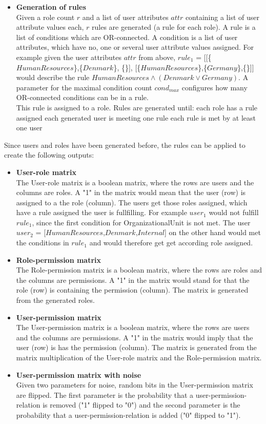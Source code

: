 \begin{itemize}
		\item \textbf{Generation of rules}\\
		Given a role count $r$ and a list of user attributes $attr$ containing a list of user attribute values each, $r$ rules are generated (a rule for each role). A rule is a list of conditions which are OR-connected. A condition is a list of user attributes, which have no, one or several user attribute values assigned. For example given the user attributes $attr$ from above, $rule_1$ = [[\{$HumanResources$\},\{$Denmark$\}, \{\}], [\{$HumanResources$\},\{$Germany$\},\{\}]] would describe the rule $HumanResources \wedge (Denmark \vee Germany)$. A parameter for the maximal condition count $cond_{max}$ configures how many OR-connected conditions can be in a rule.\\
		This rule is assigned to a role. Rules are generated until:
		\subitem \textbullet \space each role has a rule assigned
		\subitem \textbullet \space each generated user is meeting one rule
		\subitem \textbullet \space each rule is met by at least one user
	\end{itemize}
	Since users and roles have been generated before, the rules can be applied to create the following outputs:
	\begin{itemize}
		\item \textbf{User-role matrix}\\
		The User-role matrix is a boolean matrix, where the rows are users and the columns are roles. A "1" in the matrix would mean that the user (row) is assigned to a the role (column). The users get those roles assigned, which have a rule assigned the user is fullfilling. For example $user_1$ would not fulfill $rule_1$, since the first condition for OrganizationalUnit is not met. The user $user_2$ = [$HumanResources$,$Denmark$,$Internal$] on the other hand would met the conditions in $rule_1$ and would therefore get get according role assigned.
		\item \textbf{Role-permission matrix}\\
		The Role-permission matrix is a boolean matrix, where the rows are roles and the columns are permissions. A "1" in the matrix would stand for that the role (row) is containing the permission (column). The matrix is generated from the generated roles.
		\item \textbf{User-permission matrix}\\
		The User-permission matrix is a boolean matrix, where the rows are users and the columns are permissions. A "1" in the matrix would imply that the user (row) is has the permission (column). The matrix is generated from the matrix multiplication of the User-role matrix and the Role-permission matrix.
		\item \textbf{User-permission matrix with noise}\\
		Given two parameters for noise, random bits in the User-permission matrix are flipped. The first parameter is the probability that a user-permission-relation is removed ("1" flipped to "0") and the second parameter is the probability that a user-permission-relation is added ("0" flipped to "1").
	\end{itemize}